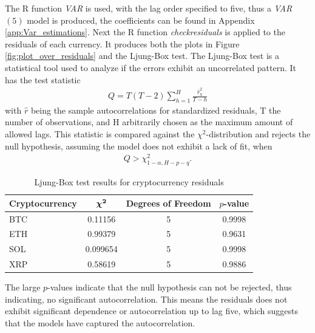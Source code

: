 \noindent The R function \textit{VAR} is used, with the lag order specified to five, thus a \textit{VAR}$(5)$ model is produced, the coefficients can be found in Appendix \ref{app:Var_estimations}. Next the R function \textit{checkresiduals} is applied to the residuals of each currency. It produces both the plots in Figure \ref{fig:plot_over_residuals} and the Ljung-Box test. The Ljung-Box test is a statistical tool used to analyze if the errors exhibit an uncorrelated pattern. It has the test statistic 
\begin{align*}
    Q=T(T-2)\sum^H_{h=1}\frac{\hat{r}^2_{h}}{T-h}
\end{align*}
with $\hat{r}$ being the sample autocorrelations for standardized residuals, T the number of observations, and H arbitrarily chosen as the maximum amount of allowed lags. This statistic is compared against the $\chi^2$-distribution and rejects the null hypothesis, assuming the model does not exhibit a lack of fit, when
\begin{align*}
    Q>\chi^2_{1-\alpha,H-p-q}.
\end{align*}
\begin{table}[H]
\centering
\begin{tabular}{|l|c|c|c|}
\hline
\textbf{Cryptocurrency} & $\boldsymbol{\chi^2}$ & \textbf{Degrees of Freedom} & \textbf{$p$-value} \\
\hline
BTC & 0.11156 & 5 & 0.9998 \\
ETH & 0.99379 & 5 & 0.9631 \\
SOL & 0.099654 & 5 & 0.9998 \\
XRP & 0.58619 & 5 & 0.9886 \\
\hline
\end{tabular}
\caption{Ljung-Box test results for cryptocurrency residuals}
\label{tab:ljung_box}
\end{table}
\noindent The large $p$-values indicate that the null hypothesis can not be rejected, thus indicating, no significant autocorrelation. This means the residuals does not exhibit significant dependence or autocorrelation up to lag five, which suggests that the models have captured the autocorrelation.
